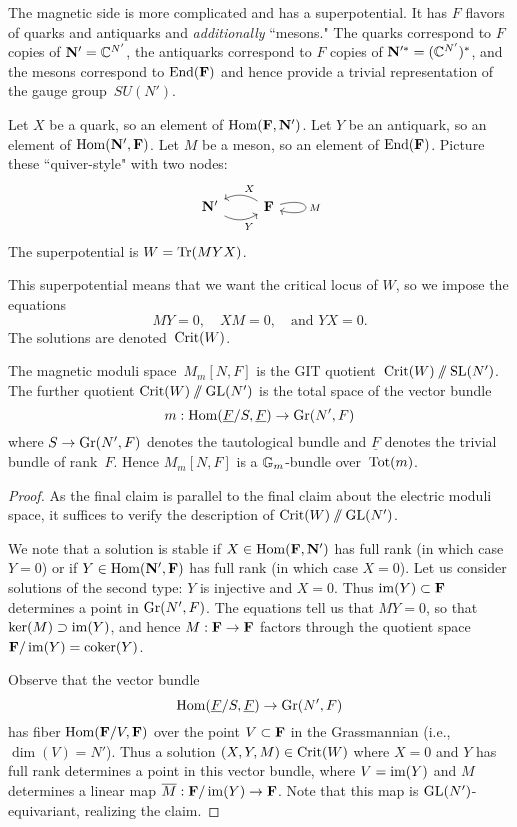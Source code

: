 \documentclass[11pt]{amsart}
\begin{document}
The magnetic side is more complicated and has a superpotential. 
It has $F$ flavors of quarks and antiquarks and {\it additionally} ``mesons." 
The quarks correspond to $F$ copies of $\mathbf N' = \mathbb C^{N'}$, 
the antiquarks correspond to $F$ copies of $\mathbf N'^*= (\mathbb C^{N'})^*$, 
and the mesons correspond to ${\rm End}(\mathbf F)$ 
and hence provide a trivial representation of the gauge group~$SU(N')$. 

Let $X$ be a quark, so an element of ${\rm Hom}(\mathbf F, \mathbf N')$.
Let $Y$ be an antiquark, so an element of ${\rm Hom}(\mathbf N', \mathbf F)$.
Let $M$ be a meson, so an element of ${\rm End}(\mathbf F)$.
Picture these ``quiver-style" with two nodes: 
\[
\begin{tikzcd}
\bN' \arrow[r, bend right, "Y"'] & \bF \arrow[l, bend right, "X"'] \arrow[loop right, looseness=15, "M"]
\end{tikzcd}
\]
The superpotential is $W=\operatorname{Tr}(MYX)$.

This superpotential means that we want the critical locus of $W$, 
so we impose the equations 
\[
MY = 0, \quad XM = 0, \quad \text{and } YX = 0. 
\]
The solutions are denoted~$\operatorname{Crit}(W)$.

\begin{prop}
The magnetic moduli space~$M_m[N,F]$ is the GIT quotient~$\operatorname{Crit}(W)\mathbin{/\mkern-6mu/} \operatorname{SL}(N')$. 
The further quotient $\operatorname{Crit}(W)\mathbin{/\mkern-6mu/} \operatorname{GL}(N')$ is the total space of the vector bundle
\[
m: {\rm Hom}(\underline{F}/S, \underline{F}) \to {\rm Gr}(N',F)
\]
where $S \to {\rm Gr}(N',F)$ denotes the tautological bundle and $\underline{F}$ denotes the trivial bundle of rank~$F$.
Hence $M_m[N,F]$ is a $\mathbb G_m$-bundle over~$\operatorname{Tot}(m)$.
\end{prop}


\begin{proof}
As the final claim is parallel to the final claim about the electric moduli space,
it suffices to verify the description of $\operatorname{Crit}(W)\mathbin{/\mkern-6mu/} \operatorname{GL}(N')$.

We note that a solution is stable if $X \in {\rm Hom}(\mathbf F, \mathbf N')$ has full rank (in which case $Y = 0$) or if $Y \in {\rm Hom}(\mathbf N', \mathbf F)$ has full rank (in which case $X = 0$).
Let us consider solutions of the second type: $Y$ is injective and $X = 0$.
Thus $\operatorname{im}(Y) \subset \mathbf F$ determines a point in ${\rm Gr}(N',F)$.
The equations tell us that $MY = 0$, so that $\ker(M) \supset \operatorname{im}(Y)$, and hence $M: \mathbf F \to \mathbf F$ factors through the quotient space $\mathbf F/\operatorname{im}(Y) = {\rm coker}(Y)$.

Observe that the vector bundle
\[
{\rm Hom}(\underline{F}/S,\underline{F}) \to {\rm Gr}(N',F)
\]
has fiber ${\rm Hom}(\mathbf F/V,\mathbf F)$ over the point $V \subset \mathbf F$ in the Grassmannian (i.e., $\dim(V) = N'$).
Thus a solution $(X,Y,M) \in \operatorname{Crit}(W)$ where $X = 0$ and $Y$ has full rank determines a point in this vector bundle, where $V = \operatorname{im}(Y)$ and $M$ determines a linear map $\overline{M}: \mathbf F/\operatorname{im}(Y) \to \mathbf F$.
Note that this map is $\operatorname{GL}(N')$-equivariant, realizing the claim.
\end{proof}
\end{document}
